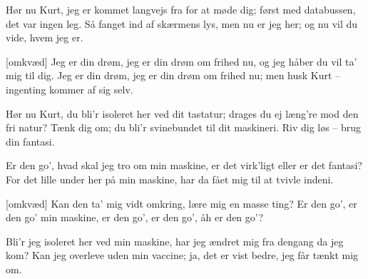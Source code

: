 \documentclass[a4paper,11pt]{article}
\begin{document}
\begin{song}


%
Hør nu Kurt, jeg er kommet langvejs fra for at møde dig;
først med databussen, det var ingen leg.
Så fanget ind af skærmens lys, men nu er jeg her;
og nu vil du vide, hvem jeg er.

[omkvæd]%
Jeg er din drøm, jeg er din drøm om frihed nu,
og jeg håber du vil ta' mig til dig.
Jeg er din drøm, jeg er din drøm om frihed nu;
men husk Kurt -- ingenting kommer af sig selv.

%
Hør nu Kurt, du bli'r isoleret her ved dit tastatur;
drages du ej læng're mod den fri natur?
Tænk dig om; du bli'r svinebundet til dit maskineri.
Riv dig løs -- brug din fantasi.
\end{song}

\begin{song}

%
Er den go', hvad skal jeg tro om min maskine,
er det virk'ligt eller er det fantasi?
For det lille under her på min maskine,
har da fået mig til at tvivle indeni.

[omkvæd]%
Kan den ta' mig vidt omkring,
lære mig en masse ting?
Er den go', er den go' min maskine,
er den go', er den go', åh er den go'?

%
Bli'r jeg isoleret her ved min maskine,
har jeg ændret mig fra dengang da jeg kom?
Kan jeg overleve uden min vaccine;
ja, det er vist bedre, jeg får tænkt mig om.
\end{song}
\end{document}
